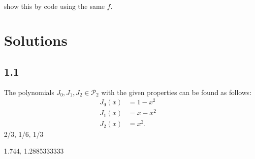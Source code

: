 \documentclass{article}%
\begin{document}
\subsection{}
show this by code using the same $f$.




\newpage
\section*{Solutions}
\subsection*{1.1}
The polynomials $J_0, J_1, J_2 \in \mathcal{P}_2$ with the given properties can be found as follows:
\begin{align*}
    J_0(x) &= 1 - x^2  \\
    J_1(x) &= x - x^2  \\
    J_2(x) &= x^2 .
\end{align*}
2/3, 1/6, 1/3

1.744, 1.2885333333
\end{document}
